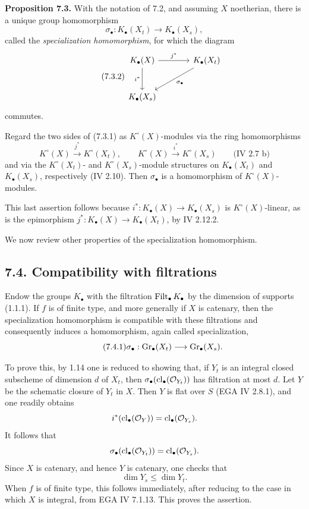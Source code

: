 \textbf{Proposition 7.3.}
With the notation of 7.2, and assuming $X$ noetherian, there is a unique
group homomorphism
\begin{equation}\tag{7.3.1}
\sigma_\bullet:K_\bullet(X_t)\longrightarrow K_\bullet(X_s),
\end{equation}
called the \emph{specialization homomorphism}, for which the diagram
\begin{equation}\tag{7.3.2}
\begin{tikzcd}[column sep=large,row sep=large]
K_\bullet(X) \arrow[r,"j^*"] \arrow[d,"i^*"'] &
K_\bullet(X_t) \arrow[dl,"\sigma_\bullet"]\\
K_\bullet(X_s) &
\end{tikzcd}
\end{equation}
commutes.

Regard the two sides of (7.3.1) as $K^\circ(X)$-modules via the ring
homomorphisms
\[
K^\circ(X)\xrightarrow{j^*}K^\circ(X_t),
\qquad
K^\circ(X)\xrightarrow{i^*}K^\circ(X_s)
\qquad\text{(IV 2.7 b)}
\]
and via the $K^\circ(X_t)$- and $K^\circ(X_s)$-module structures on
$K_\bullet(X_t)$ and $K_\bullet(X_s)$, respectively (IV 2.10). Then
$\sigma_\bullet$ is a homomorphism of $K^\circ(X)$-modules.

This last assertion follows because
$i^*:K_\bullet(X)\to K_\bullet(X_s)$ is $K^\circ(X)$-linear, as is the
epimorphism $j^*:K_\bullet(X)\to K_\bullet(X_t)$, by IV 2.12.2.

We now review other properties of the specialization homomorphism.

\subsection*{7.4. Compatibility with filtrations}
Endow the groups $K_\bullet$ with the filtration $\operatorname{Filt}_\bullet K_\bullet$
by the dimension of supports (1.1.1). If $f$ is of finite type, and more
generally if $X$ is catenary, then the specialization homomorphism is
compatible with these filtrations and consequently induces a homomorphism,
again called specialization,
\begin{equation}\tag{7.4.1}
\sigma_\bullet:\operatorname{Gr}_\bullet(X_t)\longrightarrow\operatorname{Gr}_\bullet(X_s).
\end{equation}

To prove this, by 1.14 one is reduced to showing that, if $Y_t$ is an
integral closed subscheme of dimension $d$ of $X_t$, then
$\sigma_\bullet(\operatorname{cl}_\bullet(\mathcal O_{Y_t}))$ has filtration at most
$d$. Let $Y$ be the schematic closure of $Y_t$ in $X$. Then $Y$ is flat
over $S$ (EGA IV 2.8.1), and one readily obtains
\[
i^*(\operatorname{cl}_\bullet(\mathcal O_Y))
=\operatorname{cl}_\bullet(\mathcal O_{Y_s}).
\]
It follows that
\[
\sigma_\bullet(\operatorname{cl}_\bullet(\mathcal O_{Y_t}))
=\operatorname{cl}_\bullet(\mathcal O_{Y_s}).
\]
Since $X$ is catenary, and hence $Y$ is catenary, one checks that
\[
\dim Y_s\leq\dim Y_t.
\]
When $f$ is of finite type, this follows immediately, after reducing to the
case in which $X$ is integral, from EGA IV 7.1.13. This proves the assertion.

